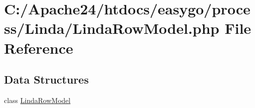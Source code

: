 \hypertarget{_linda_row_model_8php}{}\section{C\+:/\+Apache24/htdocs/easygo/process/\+Linda/\+Linda\+Row\+Model.php File Reference}
\label{_linda_row_model_8php}
\subsection*{Data Structures}
\begin{DoxyCompactItemize}
\item 
class \hyperlink{class_linda_row_model}{Linda\+Row\+Model}
\end{DoxyCompactItemize}
